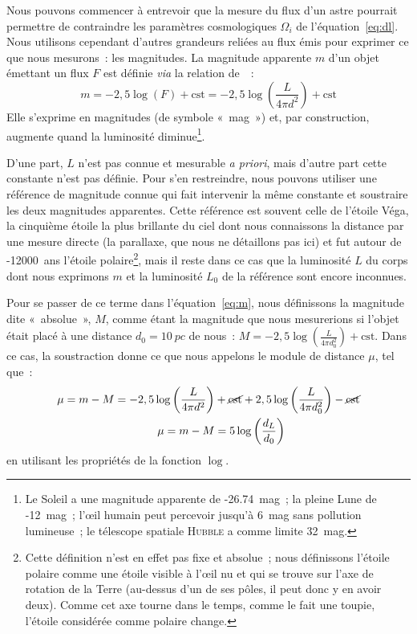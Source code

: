 \documentclass[../main/main.tex]{subfiles}
\begin{document}
Nous pouvons commencer à entrevoir que la mesure du flux d'un astre pourrait
permettre de contraindre les paramètres cosmologiques $\Omega_i$ de
l'équation~\ref{eq:dl}. Nous utilisons cependant d'autres grandeurs reliées au
flux émis pour exprimer ce que nous mesurons~: les magnitudes. La magnitude
apparente $m$ d'un objet émettant un flux $F$ est définie \textit{via} la
relation de~\cite{pogson1856}~:
\begin{equation}\label{eq:m}
    m = -2,5\log \left(F\right) + \text{cst} =
    -2,5\log \left( \frac{L}{4\pi d^2} \right) + \text{cst}
\end{equation}
Elle s'exprime en magnitudes (de symbole «~mag~») et, par construction, augmente
quand la luminosité diminue\footnote{Le Soleil a une magnitude apparente de
    -\SI{26.74}{mag}~; la pleine Lune de -\SI{12}{mag}~; l'œil humain peut
    percevoir jusqu'à \SI{6}{mag} sans pollution lumineuse~; le télescope
spatiale \textsc{Hubble} a comme limite \SI{32}{mag}.}.

D'une part, $L$ n'est pas connue et mesurable \textit{a priori}, mais d'autre
part cette constante n'est pas définie. Pour s'en restreindre, nous pouvons
utiliser une référence de magnitude connue qui fait intervenir la même constante
et soustraire les deux magnitudes apparentes. Cette référence est souvent celle
de l'étoile Véga, la cinquième étoile la plus brillante du ciel dont nous
connaissons la distance par une mesure directe (la parallaxe, que nous ne
détaillons pas ici) et fut autour de -\SI{12000}{ans} l'étoile
polaire\footnote{Cette définition n'est en effet pas fixe et absolue~; nous
    définissons l'étoile polaire comme une étoile visible à l'œil nu et qui se
    trouve sur l'axe de rotation de la Terre (au-dessus d'un de ses pôles, il
    peut donc y en avoir deux). Comme cet axe tourne dans le temps, comme le
    fait une
toupie, l'étoile considérée comme polaire change.}, mais il reste dans ce cas que
la luminosité $L$ du corps dont nous exprimons $m$ et la luminosité $L_0$ de la
référence sont encore inconnues.

Pour se passer de ce terme dans l'équation~\ref{eq:m}, nous définissons la
magnitude dite «~absolue~», $M$, comme étant la magnitude que nous mesurerions
si l'objet était placé à une distance $d_0 = \SI{10}{pc}$ de nous~: $M =
-2,5\log \left( \frac{L}{4\pi d_0^2} \right) + \text{cst}$. Dans ce cas, la
soustraction donne ce que nous appelons le module de distance $\mu$, tel que~:
\begin{align}\label{eq:mucosmo}
    \mu = m - M = -2,5\log \left( \frac{L}{4\pi d^2} \right) & +
    \cancel{\text{cst}} + 2,5\log \left( \frac{L}{4\pi d_0^2} \right) -
    \cancel{\text{cst}}\nonumber\\
    \mu = m-M & = 5\log \left( \frac{d_L}{d_0} \right)
\end{align}
en utilisant les propriétés de la fonction $\log$.
\end{document}
